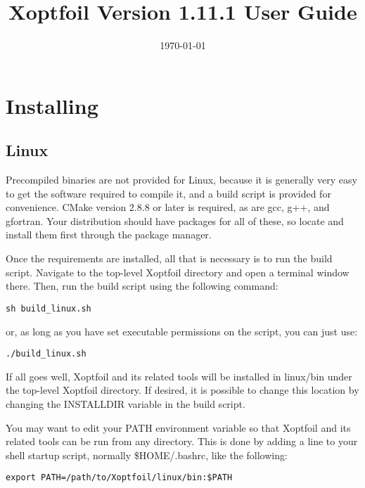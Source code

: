 \documentclass[11pt]{article}
\begin{document}
\title{Xoptfoil Version 1.11.1 User Guide}
\date{\today}
\maketitle

\tableofcontents

\section{Installing}\label{sec:installing}

\subsection{Linux}\label{sec:build_linux}

Precompiled binaries are not provided for Linux, because it is
generally very easy to get the software required to compile it, and a build script is
provided for convenience. CMake version 2.8.8 or later is required, as are gcc, g++, and
gfortran. Your distribution should have packages for all of these, so locate and install
them first through the package manager.

Once the requirements are installed, all that is necessary is to run the build script.
Navigate to the top-level Xoptfoil directory and open a terminal window there. Then, run
the build script using the following command:

\begin{verbatim}
sh build_linux.sh
\end{verbatim}

\noindent or, as long as you have set executable permissions on the script, you can just
use:

\begin{verbatim}
./build_linux.sh
\end{verbatim}

If all goes well, Xoptfoil and its related tools will be installed in linux/bin under the
top-level Xoptfoil directory. If desired, it is possible to change this location by
changing the INSTALLDIR variable in the build script.

You may want to edit your PATH environment variable so that Xoptfoil and its related tools
can be run from any directory. This is done by adding a line to your shell startup script,
normally \$HOME/.bashrc, like the following:

\begin{verbatim}
export PATH=/path/to/Xoptfoil/linux/bin:$PATH
\end{verbatim}
\end{document}
